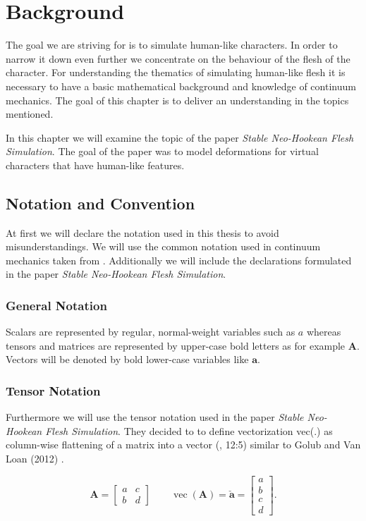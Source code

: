 \chapter{Background} \label{c:Background}
The goal we are striving for is to simulate human-like characters. In order to narrow it down even further we concentrate on the behaviour of the flesh of the character. 
For understanding the thematics of simulating human-like flesh it is necessary to have a basic mathematical background and knowledge of continuum mechanics. The goal of this chapter is to deliver an understanding in the topics mentioned.

In this chapter we will examine the topic of the paper \textit{Stable Neo-Hookean Flesh Simulation}. The goal of the paper was to model deformations for virtual characters that have human-like features.


\section{Notation and Convention}
At first we will declare the notation used in this thesis to avoid misunderstandings. We will use the common notation used in continuum mechanics taken from \cite{Spencer1980}. Additionally we will include the declarations formulated in the paper \textit{Stable Neo-Hookean Flesh Simulation}. 

\subsection{General Notation}
Scalars are represented by regular, normal-weight variables such as $a$ whereas 
tensors and matrices are represented by upper-case bold letters as for example $\textbf{A}$. Vectors will be denoted by bold lower-case variables like $\textbf{a}$. 


\subsection{Tensor Notation}
Furthermore we will use the tensor notation used in the paper \textit{Stable Neo-Hookean Flesh Simulation}. They decided to to define vectorization vec(.) as column-wise flattening of a matrix into a vector (\cite{Smith:2018:SNF:3191713.3180491}, 12:5) similar to Golub and Van Loan (2012) \cite{golub2012matrix}.

\[
\textbf{A} = \begin{bmatrix} a & c \\ b & d \end{bmatrix} \qquad \operatorname{vec}(\textbf{A}) = \boldsymbol{\check{a}} = \begin{bmatrix} a \\ b \\ c \\ d \end{bmatrix}.
\]


